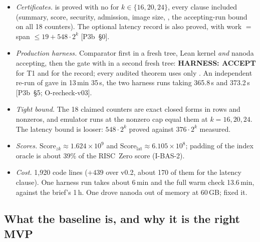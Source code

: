 \begin{takeaway}
\begin{itemize}[nosep,leftmargin=*]
\item \emph{Certificates.} 
  is proved with no  for $k\in\{16,20,24\}$, every clause included (summary, score,
  security, admission, image size, , the accepting-run bound on all 18 counters). The
  optional latency record  is also proved, with work $=$ span $\le19+548\cdot2^k$
  [P3b~§0].
\item \emph{Production harness.} Comparator first in a fresh tree, Lean kernel \emph{and} nanoda
  \cite{nanoda} accepting, then the gate with  in a second fresh tree: \textbf{HARNESS:
  ACCEPT} for T1 and for the  record; every audited theorem uses only
  . An independent re-run of  gave
   in 13\,min 35\,s, the two harness runs taking 365.8\,s and 373.2\,s
  [P3b~§5; O-recheck-v03].
\item \emph{Tight bound.} The 18 claimed counters are exact closed forms in rows and nonzeros, and
  emulator runs at the nonzero cap equal them at $k=16,20,24$. The latency bound is looser:
  $548\cdot2^k$ proved against $376\cdot2^k$ measured.
\item \emph{Scores.} $\mathrm{Score}_{zk}\approx1.624\times10^9$ and
  $\mathrm{Score}_{\mathrm{lat}}\approx6.105\times10^8$; padding of the index oracle is about 39\% of the
  RISC~Zero score (I-BAS-2).
\item \emph{Cost.} 1{,}920 code lines ($+439$ over v0.2, about 170 of them for the latency clause). One
  harness run takes about 6\,min and the full warm check 13.6\,min, against the brief's 1\,h. One
   drove nanoda out of memory at 60\,GB;  fixed it.
\end{itemize}
\end{takeaway}

\subsection{What the baseline is, and why it is the right MVP}\label{subsec:base-what}

